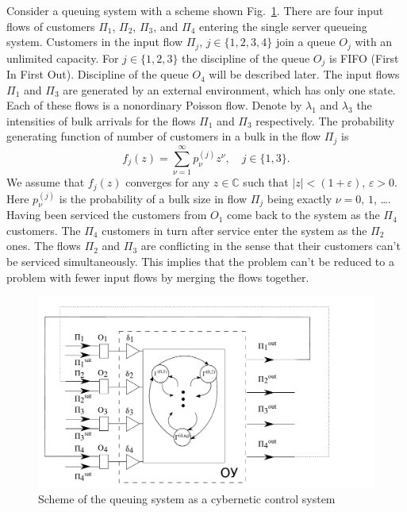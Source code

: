 \documentclass[runningheads,a4paper]{llncs}
\begin{document}
Consider a queuing system with a scheme shown Fig.~\ref{SystemScheme}.  There are four
input flows of customers $\Pi_1$, $\Pi_2$, $\Pi_3$, and $\Pi_4$ entering the single server queueing
system. Customers in the input flow $\Pi_j$, $j \in \{1,2,3,4\}$ join a queue $O_j$ with an unlimited capacity. For $j \in \{1,2,3\}$ the discipline of the queue $O_j$ is FIFO (First In First
Out). Discipline of the queue $O_4$ will be described later. The input flows $\Pi_1$ and $\Pi_3$ are
generated by an external environment, which has only one state. Each of these flows is a nonordinary Poisson flow. Denote by $\lambda_1$ and $\lambda_3$ the intensities of bulk arrivals for the flows
$\Pi_1$ and $\Pi_3$ respectively. The probability generating function of number of customers in a
bulk in the flow $\Pi_j$ is
\begin{equation}
f_j(z) = \sum_{\nu=1}^{\infty} p_{\nu}^{(j)} z ^{\nu}, \quad j\in \{1,3\}.
\label{GeneratingFunc}
\end{equation}
We assume that $f_j(z)$ converges for any $z\in \mathbb{C}$ such that $|z|<(1+\varepsilon)$,
$\varepsilon>0$. Here $p_{\nu}^{(j)}$ is the probability of a bulk size in flow $\Pi_j$ being
exactly $\nu=0$, $1$, \ldots. Having been serviced the customers from $O_1$ come back to the system
as the $\Pi_4$ customers. The $\Pi_4$ customers in turn after service enter the system as the
$\Pi_2$ ones. The flows $\Pi_2$ and $\Pi_3$ are conflicting in the sense that their customers can't
be serviced simultaneously. This implies that the problem can't be reduced to a problem with fewer
input flows by merging the flows together.
\begin{figure}[h!]
\centering
    \includegraphics[width=\textwidth]{SystemScheme.pdf} 
    \caption {Scheme of the queuing system as a cybernetic control system}
    \label{SystemScheme}
\end{figure}
\end{document}

